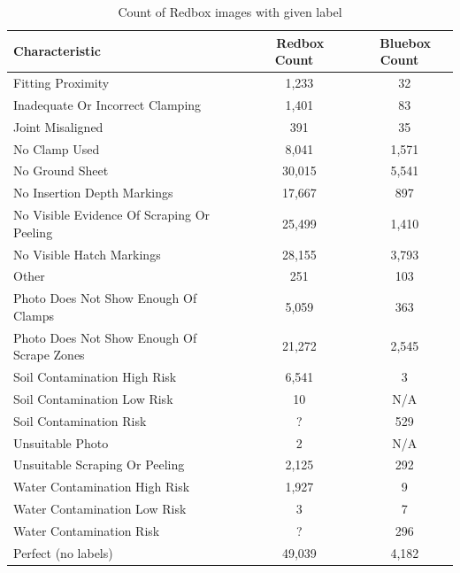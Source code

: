 \documentclass[a4paper,11pt]{article}
\begin{document}
\begin{table}[h!]
   \centering
    \begin{tabular}{|l|c|c|}
    \hline
    Characteristic                              & ~ Redbox Count  & ~ Bluebox Count \\ \hline
    Fitting Proximity                           & ~  1,233        & ~ 32      \\
    Inadequate Or Incorrect Clamping            & ~ 1,401         & ~ 83      \\
    Joint Misaligned                            & ~ 391           & ~ 35      \\
    No Clamp Used                               & ~ 8,041         & ~ 1,571   \\
    No Ground Sheet                             & ~  30,015       & ~ 5,541   \\
    No Insertion Depth Markings                 & ~ 17,667        & ~ 897     \\
    No Visible Evidence Of Scraping Or Peeling  & ~ 25,499        & ~ 1,410   \\
    No Visible Hatch Markings                   & ~ 28,155        & ~ 3,793   \\
    Other                                       & ~  251          & ~ 103     \\
    Photo Does Not Show Enough Of Clamps        & ~ 5,059         & ~ 363     \\
    Photo Does Not Show Enough Of Scrape Zones  & ~ 21,272        & ~ 2,545   \\
    Soil Contamination High Risk                & ~ 6,541         & ~ 3       \\
    Soil Contamination Low Risk                 & ~ 10            & ~ N/A     \\
    Soil Contamination Risk                     & ~ ?             & ~ 529     \\
    Unsuitable Photo                            & ~ 2             & ~ N/A     \\
    Unsuitable Scraping Or Peeling              & ~ 2,125         & ~ 292     \\
    Water Contamination High Risk               & ~ 1,927         & ~ 9       \\
    Water Contamination Low Risk                & ~ 3             & ~ 7       \\
	Water Contamination Risk                    & ~ ?             & ~ 296     \\
     \hline
    Perfect (no labels)                         & ~ 49,039        & ~ 4,182   \\
    \hline
    \end{tabular}
    \caption {Count of Redbox images with given label}
    \label{f3}
\end{table} 
\end{document}
